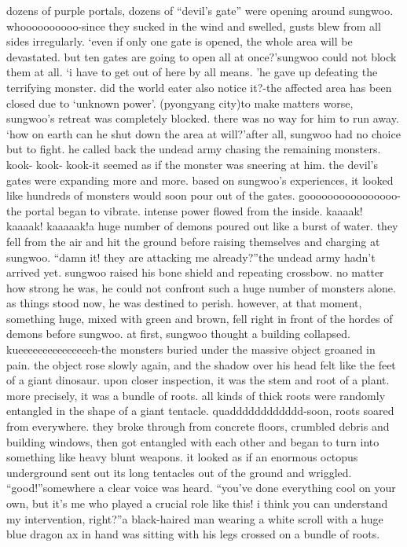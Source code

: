 dozens of purple portals, dozens of “devil’s gate” were opening around sungwoo.
whoooooooooo-since they sucked in the wind and swelled, gusts blew from all sides irregularly.
‘even if only one gate is opened, the whole area will be devastated.
 but ten gates are going to open all at once?’sungwoo could not block them at all.
‘i have to get out of here by all means.
’he gave up defeating the terrifying monster.
did the world eater also notice it?-the affected area has been closed due to ‘unknown power’.
 (pyongyang city)to make matters worse, sungwoo’s retreat was completely blocked.
 there was no way for him to run away.
‘how on earth can he shut down the area at will?’after all, sungwoo had no choice but to fight.
 he called back the undead army chasing the remaining monsters.
kook- kook- kook-it seemed as if the monster was sneering at him.
 the devil’s gates were expanding more and more.
 based on sungwoo’s experiences, it looked like hundreds of monsters would soon pour out of the gates.
goooooooooooooooo-the portal began to vibrate.
 intense power flowed from the inside.
kaaaak! kaaaak! kaaaaak!a huge number of demons poured out like a burst of water.
 they fell from the air and hit the ground before raising themselves and charging at sungwoo.
“damn it! they are attacking me already?”the undead army hadn’t arrived yet.
 sungwoo raised his bone shield and repeating crossbow.
no matter how strong he was, he could not confront such a huge number of monsters alone.
 as things stood now, he was destined to perish.
however, at that moment, something huge, mixed with green and brown, fell right in front of the hordes of demons before sungwoo.
 at first, sungwoo thought a building collapsed.
kueeeeeeeeeeeeeeeh-the monsters buried under the massive object groaned in pain.
 the object rose slowly again, and the shadow over his head felt like the feet of a giant dinosaur.
upon closer inspection, it was the stem and root of a plant.
 more precisely, it was a bundle of roots.
 all kinds of thick roots were randomly entangled in the shape of a giant tentacle.
quadddddddddddd-soon, roots soared from everywhere.
 they broke through from concrete floors, crumbled debris and building windows, then got entangled with each other and began to turn into something like heavy blunt weapons.
it looked as if an enormous octopus underground sent out its long tentacles out of the ground and wriggled.
“good!”somewhere a clear voice was heard.
“you’ve done everything cool on your own, but it’s me who played a crucial role like this! i think you can understand my intervention, right?”a black-haired man wearing a white scroll with a huge blue dragon ax in hand was sitting with his legs crossed on a bundle of roots.
